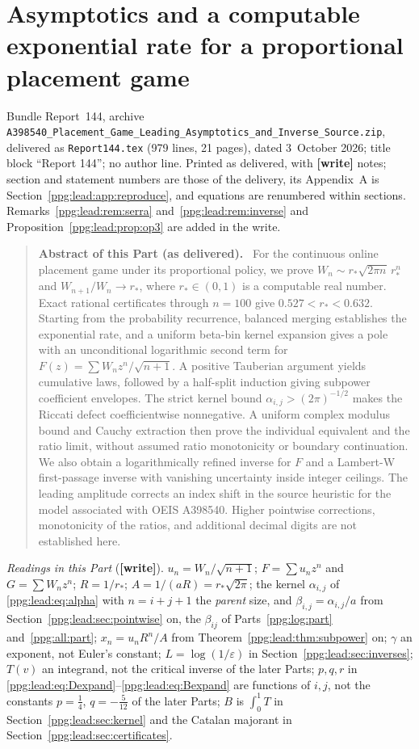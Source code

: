 \documentclass[11pt,letterpaper]{article}
\theoremstyle{remark}\newtheorem{remark}[theorem]{Remark}
\numberwithin{equation}{section}
\newcommand{\file}[1]{\nolinkurl{#1}}
\newcommand{\wtag}{\textup{\textbf{[write]}}}
\newenvironment{partabstract}{\begin{quote}\small\noindent\textbf{Abstract of this Part (as delivered).}\ }{\end{quote}}
\newcommand{\partsource}[1]{\par\noindent\begin{minipage}{\textwidth}\small #1\end{minipage}\par\medskip}
\begin{document}
\clearpage
\part{Asymptotics and a computable exponential rate for a proportional placement game}\label{ppg:lead:part}
\partsource{Bundle Report~144, archive \file{A398540_Placement_Game_Leading_Asymptotics_and_Inverse_Source.zip}, delivered as \file{Report144.tex} (979 lines, 21 pages), dated 3~October 2026; title block ``Report 144''; no author line. Printed as delivered, with \textbf{[write]} notes; section and statement numbers are those of the delivery, its Appendix~A is Section~\ref{ppg:lead:app:reproduce}, and equations are renumbered within sections. Remarks~\ref{ppg:lead:rem:serra} and~\ref{ppg:lead:rem:inverse} and Proposition~\ref{ppg:lead:prop:op3} are added in the write.}
\begin{partabstract}
For the continuous online placement game under its proportional policy, we prove
$W_n\sim r_*\sqrt{2\pi n}\,r_*^n$ and $W_{n+1}/W_n\to r_*$, where $r_*\in(0,1)$ is a computable real number. Exact rational certificates through $n=100$ give $0.527<r_*<0.632$. Starting from the probability recurrence, balanced merging establishes the exponential rate, and a uniform beta-bin kernel expansion gives a pole with an unconditional logarithmic second term for $F(z)=\sum W_nz^n/\sqrt{n+1}$. A positive Tauberian argument yields cumulative laws, followed by a half-split induction giving subpower coefficient envelopes. The strict kernel bound $\alpha_{i,j}>(2\pi)^{-1/2}$ makes the Riccati defect coefficientwise nonnegative. A uniform complex modulus bound and Cauchy extraction then prove the individual equivalent and the ratio limit, without assumed ratio monotonicity or boundary continuation. We also obtain a logarithmically refined inverse for $F$ and a Lambert-W first-passage inverse with vanishing uncertainty inside integer ceilings. The leading amplitude corrects an index shift in the source heuristic for the model associated with OEIS A398540. Higher pointwise corrections, monotonicity of the ratios, and additional decimal digits are not established here.
\end{partabstract}
{\small\emph{Readings in this Part} (\wtag). $u_n=W_n/\sqrt{n+1}$; $F=\sum u_nz^n$ and $G=\sum W_nz^n$; $R=1/r_*$; $A=1/(aR)=r_*\sqrt{2\pi}$; the kernel $\alpha_{i,j}$ of \eqref{ppg:lead:eq:alpha} with $n=i+j+1$ the \emph{parent} size, and $\beta_{i,j}=\alpha_{i,j}/a$ from Section~\ref{ppg:lead:sec:pointwise} on, the $\beta_{ij}$ of Parts~\ref{ppg:log:part} and~\ref{ppg:all:part}; $x_n=u_nR^n/A$ from Theorem~\ref{ppg:lead:thm:subpower} on; $\gamma$ an exponent, not Euler's constant; $L=\log(1/\varepsilon)$ in Section~\ref{ppg:lead:sec:inverses}; $T(v)$ an integrand, not the critical inverse of the later Parts; $p,q,r$ in \eqref{ppg:lead:eq:Dexpand}--\eqref{ppg:lead:eq:Bexpand} are functions of $i,j$, not the constants $p=\frac14$, $q=-\frac5{12}$ of the later Parts; $B$ is $\int_0^1T$ in Section~\ref{ppg:lead:sec:kernel} and the Catalan majorant in Section~\ref{ppg:lead:sec:certificates}.\par}
\end{document}
